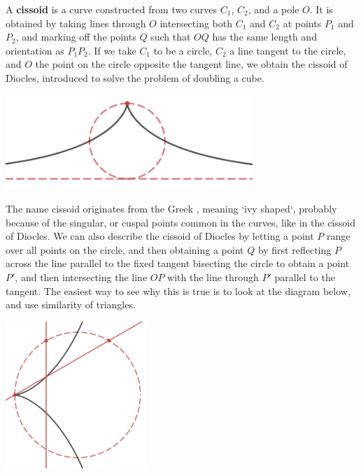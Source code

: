 \begin{example}
    A {\bf cissoid} is a curve constructed from two curves $C_1$, $C_2$, and a pole $O$. It is obtained by taking lines through $O$ intersecting both $C_1$ and $C_2$ at points $P_1$ and $P_2$, and marking off the points $Q$ such that $OQ$ has the same length and orientation as $P_1P_2$. If we take $C_1$ to be a circle, $C_2$ a line tangent to the circle, and $O$ the point on the circle opposite the tangent line, we obtain the cissoid of Diocles, introduced to solve the problem of doubling a cube.
    \begin{center}
    \includegraphics[width=0.7\textwidth]{algebraicGeometryCissoidDiocles}
    \end{center}
    The name cissoid originates from the Greek \textkappa \textiota \textsigma \textsigma \textomikron \textepsilon \textiota \textdelta \texteta \textvarsigma, meaning `ivy shaped`, probably because of the singular, or cuspal points common in the curves, like in the cissoid of Diocles. We can also describe the cissoid of Diocles by letting a point $P$ range over all points on the circle, and then obtaining a point $Q$ by first reflecting $P$ across the line parallel to the fixed tangent bisecting the circle to obtain a point $P'$, and then intersecting the line $OP$ with the line through $P'$ parallel to the tangent. The easiest way to see why this is true is to look at the diagram below, and use similarity of triangles.
    \begin{center}
        \includegraphics[width=0.4\textwidth]{algebraicGeometryCissoidDiocles2}
    \end{center}

\end{example}
